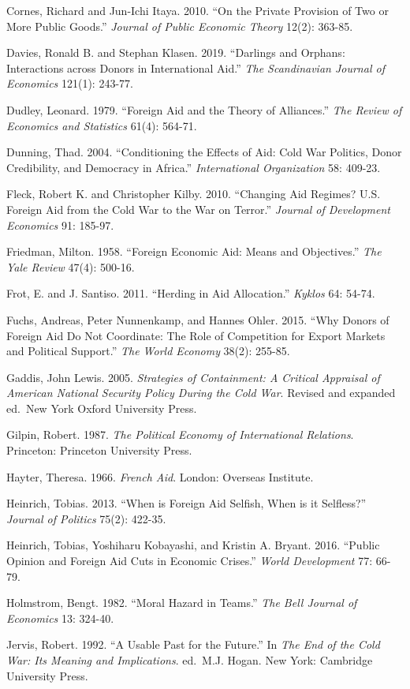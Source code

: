 \documentclass[12pt,]{article}
\begin{document}
Cornes, Richard and Jun-Ichi Itaya. 2010. ``On the Private Provision of
Two or More Public Goods.'' \emph{Journal of Public Economic Theory}
12(2): 363-85.

Davies, Ronald B. and Stephan Klasen. 2019. ``Darlings and Orphans:
Interactions across Donors in International Aid.'' \emph{The
Scandinavian Journal of Economics} 121(1): 243-77.

Dudley, Leonard. 1979. ``Foreign Aid and the Theory of Alliances.''
\emph{The Review of Economics and Statistics} 61(4): 564-71.

Dunning, Thad. 2004. ``Conditioning the Effects of Aid: Cold War
Politics, Donor Credibility, and Democracy in Africa.''
\emph{International Organization} 58: 409-23.

Fleck, Robert K. and Christopher Kilby. 2010. ``Changing Aid Regimes?
U.S. Foreign Aid from the Cold War to the War on Terror.'' \emph{Journal
of Development Economics} 91: 185-97.

Friedman, Milton. 1958. ``Foreign Economic Aid: Means and Objectives.''
\emph{The Yale Review} 47(4): 500-16.

Frot, E. and J. Santiso. 2011. ``Herding in Aid Allocation.''
\emph{Kyklos} 64: 54-74.

Fuchs, Andreas, Peter Nunnenkamp, and Hannes Ohler. 2015. ``Why Donors
of Foreign Aid Do Not Coordinate: The Role of Competition for Export
Markets and Political Support.'' \emph{The World Economy} 38(2): 255-85.

Gaddis, John Lewis. 2005. \emph{Strategies of Containment: A Critical
Appraisal of American National Security Policy During the Cold War}.
Revised and expanded ed.~New York Oxford University Press.

Gilpin, Robert. 1987. \emph{The Political Economy of International
Relations}. Princeton: Princeton University Press.

Hayter, Theresa. 1966. \emph{French Aid}. London: Overseas Institute.

Heinrich, Tobias. 2013. ``When is Foreign Aid Selfish, When is it
Selfless?'' \emph{Journal of Politics} 75(2): 422-35.

Heinrich, Tobias, Yoshiharu Kobayashi, and Kristin A. Bryant. 2016.
``Public Opinion and Foreign Aid Cuts in Economic Crises.'' \emph{World
Development} 77: 66-79.

Holmstrom, Bengt. 1982. ``Moral Hazard in Teams.'' \emph{The Bell
Journal of Economics} 13: 324-40.

Jervis, Robert. 1992. ``A Usable Past for the Future.'' In \emph{The End
of the Cold War: Its Meaning and Implications}. ed.~M.J. Hogan. New
York: Cambridge University Press.
\end{document}
